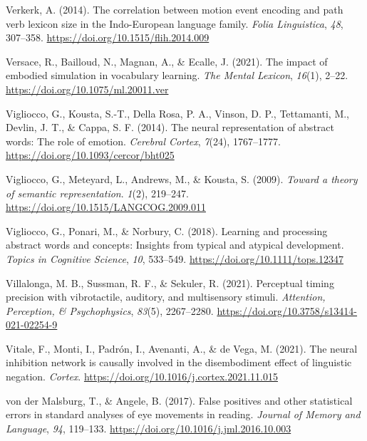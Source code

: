 \documentclass[
  12pt,
  man,floatsintext]{apa7}
\newlength{\cslhangindent}
\newlength{\cslentryspacingunit} %
\newenvironment{CSLReferences}[2] %
 {%
  \setlength{\parindent}{0pt}
  \ifodd #1
  \let\oldpar\par
  \def\par{\hangindent=\cslhangindent\oldpar}
  \fi
  \setlength{\parskip}{#2\cslentryspacingunit}
 }%
 {}
\begin{document}
\begin{CSLReferences}{1}{0}
\leavevmode{}%
Verkerk, A. (2014). The correlation between motion event encoding and path verb lexicon size in the {Indo-European} language family. \emph{Folia Linguistica}, \emph{48}, 307--358. \url{https://doi.org/10.1515/flih.2014.009}

\leavevmode{}%
Versace, R., Bailloud, N., Magnan, A., \& Ecalle, J. (2021). The impact of embodied simulation in vocabulary learning. \emph{The Mental Lexicon}, \emph{16}(1), 2--22. \url{https://doi.org/10.1075/ml.20011.ver}

\leavevmode{}%
Vigliocco, G., Kousta, S.-T., Della Rosa, P. A., Vinson, D. P., Tettamanti, M., Devlin, J. T., \& Cappa, S. F. (2014). The neural representation of abstract words: The role of emotion. \emph{Cerebral Cortex}, \emph{7}(24), 1767--1777. \url{https://doi.org/10.1093/cercor/bht025}

\leavevmode{}%
Vigliocco, G., Meteyard, L., Andrews, M., \& Kousta, S. (2009). \emph{Toward a theory of semantic representation}. \emph{1}(2), 219--247. \url{https://doi.org/10.1515/LANGCOG.2009.011}

\leavevmode{}%
Vigliocco, G., Ponari, M., \& Norbury, C. (2018). Learning and processing abstract words and concepts: {Insights} from typical and atypical development. \emph{Topics in Cognitive Science}, \emph{10}, 533--549. \url{https://doi.org/10.1111/tops.12347}

\leavevmode{}%
Villalonga, M. B., Sussman, R. F., \& Sekuler, R. (2021). Perceptual timing precision with vibrotactile, auditory, and multisensory stimuli. \emph{Attention, Perception, \& Psychophysics}, \emph{83}(5), 2267--2280. \url{https://doi.org/10.3758/s13414-021-02254-9}

\leavevmode{}%
Vitale, F., Monti, I., Padrón, I., Avenanti, A., \& de Vega, M. (2021). The neural inhibition network is causally involved in the disembodiment effect of linguistic negation. \emph{Cortex}. \url{https://doi.org/10.1016/j.cortex.2021.11.015}

\leavevmode{}%
von der Malsburg, T., \& Angele, B. (2017). False positives and other statistical errors in standard analyses of eye movements in reading. \emph{Journal of Memory and Language}, \emph{94}, 119--133. \url{https://doi.org/10.1016/j.jml.2016.10.003}


\end{CSLReferences}
\end{document}
